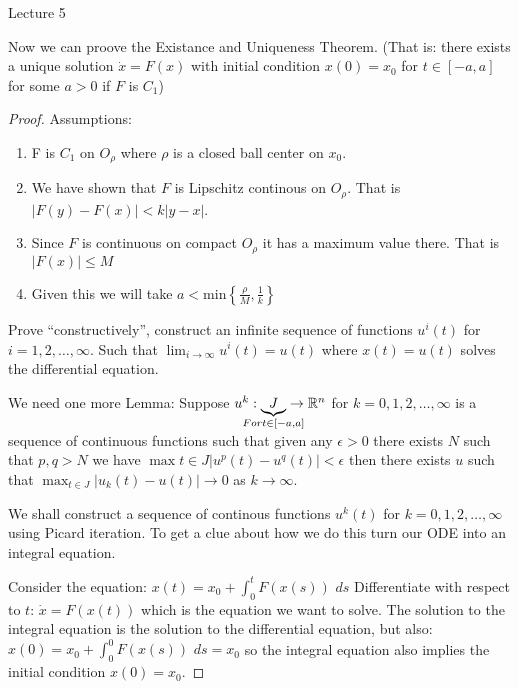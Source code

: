 \begin{center}

Lecture 5

\end{center}

Now we can proove the Existance and Uniqueness Theorem. (That is: there exists a unique solution $\dot{x} = F(x)$ with initial condition $x(0) = x_0$ for $t \in [-a, a]$ for some $a > 0$ if $F$ is $C_1$)

\begin{proof}

Assumptions:
\begin{enumerate}
\item F is $C_1$ on $O_{\rho}$ where $\rho$ is a closed ball center on $x_0$.
\item We have shown that $F$ is Lipschitz continous on $O_{\rho}$. That is $|F(y) - F(x)| < k |y-x|$.
\item Since $F$ is continuous on compact $O_{\rho}$ it has a maximum value there. That is $|F(x)| \leq M$
\item Given this we will take $a < \text{min} \left\{\frac{\rho}{M}, \frac{1}{k}\right\}$
\end{enumerate}

Prove ``constructively'', construct an infinite sequence of functions $u^i (t)$ for $i = 1,2,\ldots,\infty$. Such that $\lim_{i\rightarrow \infty} u^i(t) = u(t)$ where $x(t) = u(t)$ solves the differential equation.

We need one more Lemma: Suppose $u^k : \underbrace{J}_{\mathclap{For t \in [-a, a]}} \rightarrow \mathbb{R}^n$ for $k=0,1,2,\ldots,\infty$ is a sequence of continuous functions such that given any $\epsilon > 0$ there exists $N$ such that $p,q > N$ we have $\max{t \in J} | u^p(t) - u^q(t) | < \epsilon$ then there exists $u$ such that $\max_{t \in J} |u_k(t) - u(t)| \rightarrow 0$ as $k \rightarrow \infty$.

We shall construct a sequence of continous functions $u^k (t)$ for $k=0,1,2,\ldots,\infty$ using Picard iteration. To get a clue about how we do this turn our ODE into an integral equation.

\vspace{\baselineskip}

Consider the equation: $x(t) = x_0 + \int_0^t F(x(s)) \,\, ds$ Differentiate with respect to $t$: $\dot{x} = F(x(t))$ which is the equation we want to solve. The solution to the integral equation is the solution to the differential equation, but also: $x(0) = x_0 + \int_0^0 F(x(s)) \, \, ds = x_0$ so the integral equation also implies the initial condition $x(0) = x_0$.


\end{proof}
